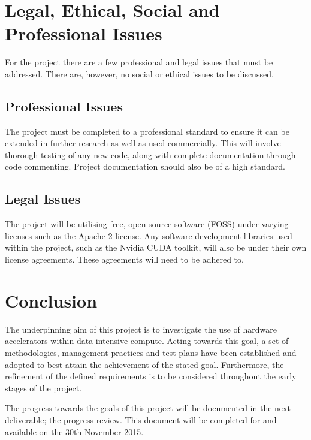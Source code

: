 \documentclass[12pt,a4paper]{article}
\begin{document}

	\section{Legal, Ethical, Social and Professional Issues} %
	\label{sec:legal_ethical_social_and_professional_issues}
		For the project there are a few professional and legal issues that must be addressed. There are, however, no social or ethical issues to be discussed.

		\subsection{Professional Issues} %
		\label{sub:professional_issues}
		
			The project must be completed to a professional standard to ensure it can be extended in further research as well as used commercially. This will involve thorough testing of any new code, along with complete documentation through code commenting. Project documentation should also be of a high standard.


		\subsection{Legal Issues} %
		\label{sub:legal_issues}
			
			The project will be utilising free, open-source software (FOSS) under varying licenses such as the Apache 2 license. Any software development libraries used within the project, such as the Nvidia CUDA toolkit, will also be under their own license agreements. These agreements will need to be adhered to.


	\section{Conclusion} %
	\label{sec:conclusion}

		The underpinning aim of this project is to investigate the use of hardware accelerators within data intensive compute. Acting towards this goal, a set of methodologies, management practices and test plans have been established and adopted to best attain the achievement of the stated goal. Furthermore, the refinement of the defined requirements is to be considered throughout the early stages of the project.

		The progress towards the goals of this project will be documented in the next deliverable; the progress review. This document will be completed for and available on the 30th November 2015.
	

	\printbibliography
\end{document}
